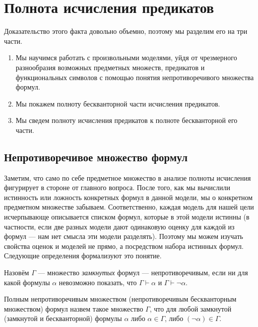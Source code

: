 \section{Полнота исчисления предикатов}

Доказательство этого факта довольно объемно, поэтому мы разделим
его на три части. 
\begin{enumerate}
\item Мы научимся работать с произвольными
моделями, уйдя от чрезмерного разнообразия возможных предметных
множеств, предикатов и функциональных символов с помощью понятия
непротиворечивого множества формул.

\item Мы покажем полноту бескванторной части исчисления предикатов.

\item Мы сведем полноту исчисления предикатов к полноте
бескванторной его части.
\end{enumerate}

\subsection{Непротиворечивое множество формул}

Заметим, что само по себе предметное множество в анализе полноты
исчисления фигурирует в стороне от главного вопроса. После того, 
как мы вычислили истинность или ложность конкретных формул в данной 
модели, мы о конкретном предметном множестве забываем. Соответственно, 
каждая модель для нашей цели исчерпывающе описывается списком формул,
которые в этой модели истинны
(в частности, если две разных модели
дают одинаковую оценку для каждой из формул --- нам нет смысла эти
модели разделять). 
Поэтому мы можем изучать свойства оценок и моделей не
прямо, а посредством набора истинных формул.
Следующие определения формализуют это понятие.

\begin{definition}
Назовём $\Gamma$ --- множество \emph{замкнутых} формул --- непротиворечивым, 
если ни для какой
формулы $\alpha$ невозможно показать, что $\Gamma \vdash \alpha$ и
$\Gamma \vdash \neg \alpha$.
\end{definition}

\begin{definition}
Полным непротиворечивым множеством (непротиворечивым бескванторным множеством)
формул назвем такое множество $\Gamma$,
что для любой замкнутой (замкнутой и бескванторной) формулы 
$\alpha$ либо $\alpha \in \Gamma$, либо
$(\neg \alpha) \in \Gamma$.
\end{definition}

